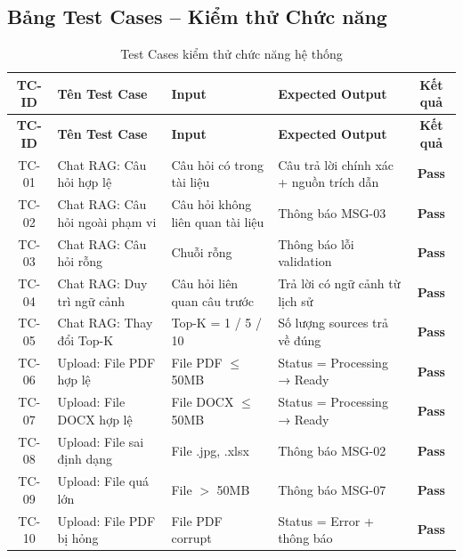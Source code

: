 \subsection{Bảng Test Cases -- Kiểm thử Chức năng}

\begin{longtable}{|c|p{3.5cm}|p{3cm}|p{3cm}|c|}
  \caption{Test Cases kiểm thử chức năng hệ thống} \label{tab:test-cases} \\
  \hline
  \rowcolor{blue!10}
  \textbf{TC-ID} & \textbf{Tên Test Case} & \textbf{Input} & \textbf{Expected Output} & \textbf{Kết quả} \\
  \hline
  \endfirsthead
  \hline
  \rowcolor{blue!10}
  \textbf{TC-ID} & \textbf{Tên Test Case} & \textbf{Input} & \textbf{Expected Output} & \textbf{Kết quả} \\
  \hline
  \endhead
  \hline
  \endfoot
  TC-01 & Chat RAG: Câu hỏi hợp lệ & Câu hỏi có trong tài liệu & Câu trả lời chính xác + nguồn trích dẫn & \textcolor{green!60!black}{\textbf{Pass}} \\
  \hline
  TC-02 & Chat RAG: Câu hỏi ngoài phạm vi & Câu hỏi không liên quan tài liệu & Thông báo MSG-03 & \textcolor{green!60!black}{\textbf{Pass}} \\
  \hline
  TC-03 & Chat RAG: Câu hỏi rỗng & Chuỗi rỗng & Thông báo lỗi validation & \textcolor{green!60!black}{\textbf{Pass}} \\
  \hline
  TC-04 & Chat RAG: Duy trì ngữ cảnh & Câu hỏi liên quan câu trước & Trả lời có ngữ cảnh từ lịch sử & \textcolor{green!60!black}{\textbf{Pass}} \\
  \hline
  TC-05 & Chat RAG: Thay đổi Top-K & Top-K = 1 / 5 / 10 & Số lượng sources trả về đúng & \textcolor{green!60!black}{\textbf{Pass}} \\
  \hline
  TC-06 & Upload: File PDF hợp lệ & File PDF $\leq$ 50MB & Status = Processing → Ready & \textcolor{green!60!black}{\textbf{Pass}} \\
  \hline
  TC-07 & Upload: File DOCX hợp lệ & File DOCX $\leq$ 50MB & Status = Processing → Ready & \textcolor{green!60!black}{\textbf{Pass}} \\
  \hline
  TC-08 & Upload: File sai định dạng & File .jpg, .xlsx & Thông báo MSG-02 & \textcolor{green!60!black}{\textbf{Pass}} \\
  \hline
  TC-09 & Upload: File quá lớn & File $>$ 50MB & Thông báo MSG-07 & \textcolor{green!60!black}{\textbf{Pass}} \\
  \hline
  TC-10 & Upload: File PDF bị hỏng & File PDF corrupt & Status = Error + thông báo & \textcolor{green!60!black}{\textbf{Pass}} \\

\end{longtable}
